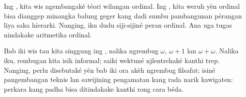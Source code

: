 \documentclass[../../../include/open-logic-section]{subfiles}
\begin{document}


Ing , kita wis ngembangaké téori wilangan ordinal.
Ing , kita weruh yèn ordinal bisa dianggep minangka
balung geger kang dadi sumbu pambangunan pérangan liya saka hierarki.
Nanging, iku dudu siji-sijiné peran ordinal. Ana uga tugas nindakake
aritmetika ordinal.

Bab iki wis tau kita singgung ing
, nalika ngrembug $\omega$,
$\omega+1$ lan $\omega+\omega$. Nalika iku, rembugan kita isih informal;
saiki wektuné njlentrehaké kanthi trep. Nanging, perlu disebutaké
yèn bab iki ora akèh ngrembug filsafat; isiné pangembangan teknis
lan sawijining pengamatan kang rada narik kawigaten: perkara kang
padha bisa ditindakake kanthi rong cara béda.
\end{document}
